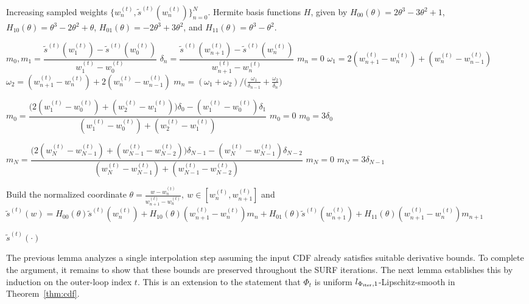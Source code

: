 \documentclass{article}
\newcommand{\Farc}{\Phi}
\begin{document}
\begin{algorithm}[t]
\caption{Piecewise Cubic Hermite Interpolating Polynomial~\citep{fritsch1980monotone} for $\{(w_n^{(t)},\tilde s^{(t)}(w_n^{(t)}))\}_{n=0}^N$}
\label{alg:PCHIP}
\begin{algorithmic}[1] 
\Require Increasing sampled weights $\{w_n^{(t)},\tilde s^{(t)}(w_n^{(t)})\}_{n=0}^N$. Hermite basis functions $H$, given by $H_{00}(\theta)=2\theta^3-3\theta^2+1$, $H_{10}(\theta)=\theta^3-2\theta^2+\theta$, $H_{01}(\theta)=-2\theta^3+3\theta^2$, and $H_{11}(\theta)=\theta^3-\theta^2$.

 \State $m_0, m_1 = \dfrac{\tilde s^{(t)}(w_{1}^{(t)})-\tilde s^{(t)}(w_0^{(t)})}{w_{1}^{(t)}-w_0^{(t)}}$
\Else
 \State $\delta_n = \dfrac{\tilde s^{(t)}(w_{n+1}^{(t)})-\tilde s^{(t)}(w_n^{(t)})}{w_{n+1}^{(t)}-w_n^{(t)}}$
 \State $m_n = 0$
 \Else
 \State $\omega_1 = 2(w_{n+1}^{(t)}-w_n^{(t)})+(w_n^{(t)}-w_{n-1}^{(t)})$
 \State $\omega_2 = (w_{n+1}^{(t)}-w_n^{(t)})+2(w_n^{(t)}-w_{n-1}^{(t)})$
 \State $m_n = (\omega_1+\omega_2)/\big(\tfrac{\omega_1}{\delta_{n-1}}+\tfrac{\omega_2}{\delta_n}\big)$
 \EndIf
 \EndFor

 \State $m_0 = \dfrac{\big(2(w_1^{(t)}-w_0^{(t)})+(w_2^{(t)}-w_1^{(t)})\big)\delta_0-(w_1^{(t)}-w_0^{(t)})\delta_1}{(w_1^{(t)}-w_0^{(t)})+(w_2^{(t)}-w_1^{(t)})}$ 
 \State $m_0 = 0$
 \State $m_0 = 3\delta_0$
 \EndIf

 \State $m_N = \dfrac{\big(2(w_N^{(t)}-w_{N-1}^{(t)})+(w_{N-1}^{(t)}-w_{N-2}^{(t)})\big)\delta_{N-1}-(w_N^{(t)}-w_{N-1}^{(t)})\delta_{N-2}}{(w_N^{(t)}-w_{N-1}^{(t)})+(w_{N-1}^{(t)}-w_{N-2}^{(t)})}$ 
 \State $m_N = 0$
 \State $m_N = 3\delta_{N-1}$
 \EndIf
\EndIf

 \State Build the normalized coordinate $\theta = \frac{w-w_n^{(t)}}{w_{n+1}^{(t)}-w_n^{(t)}}, ~w\in[w_n^{(t)},w_{n+1}^{(t)}]$ and
 $
 \tilde s^{(t)}(w)
 =
 H_{00}(\theta) \tilde s^{(t)}(w_n^{(t)})
 +
 H_{10}(\theta) (w_{n+1}^{(t)}-w_n^{(t)})m_n
 +
 H_{01}(\theta) \tilde s^{(t)}(w_{n+1}^{(t)})
 +
 H_{11}(\theta) (w_{n+1}^{(t)}-w_n^{(t)})m_{n+1}
 $
\EndFor

\State \Return $\tilde s^{(t)}(\cdot)$
\end{algorithmic}
\end{algorithm}
The previous lemma analyzes a single interpolation step assuming the input CDF already satisfies suitable derivative bounds. To complete the argument, it remains to show that these bounds are preserved throughout the SURF iterations. The next lemma establishes this by induction on the outer-loop index $t$. This is an extension to the statement that $\Farc_t$ is uniform $l_{\Farc_{\rm iter},1}$-Lipschitz-smooth in Theorem~\ref{thm:cdf}.
\end{document}
